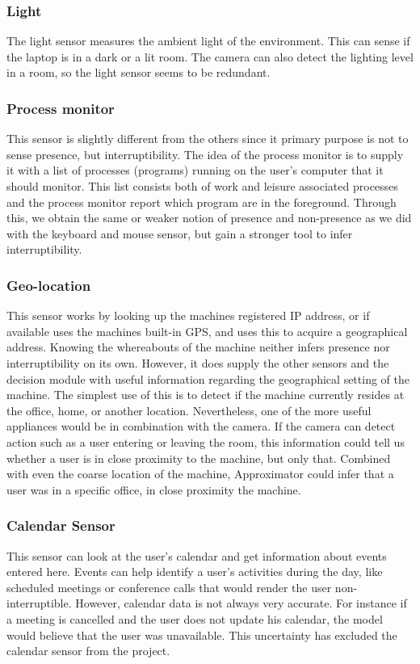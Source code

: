 \documentclass{sigchi}
\begin{document}
\subsubsection{Light}
The light sensor measures the ambient light of the environment.
This can sense if the laptop is in a dark or a lit room.
The camera can also detect the lighting level in a room, so the light sensor seems to be redundant.

\subsubsection{Process monitor}
This sensor is slightly different from the others since it primary purpose is not to sense presence, but interruptibility.
The idea of the process monitor is to supply it with a list of processes (programs) running on the user's computer that it should monitor.
This list consists both of work and leisure associated processes and the process monitor report which program are in the foreground.
Through this, we obtain the same or weaker notion of presence and non-presence as we did with the keyboard and mouse sensor, but gain a stronger tool to infer interruptibility.

\subsubsection{Geo-location}
This sensor works by looking up the machines registered IP address, or if available uses the machines built-in GPS, and uses this to acquire a geographical address.
Knowing the whereabouts of the machine neither infers presence nor interruptibility on its own.
However, it does supply the other sensors and the decision module with useful information regarding the geographical setting of the machine.
The simplest use of this is to detect if the machine currently resides at the office, home, or another location.
Nevertheless, one of the more useful appliances would be in combination with the camera.
If the camera can detect action such as a user entering or leaving the room, this information could tell us whether a user is in close proximity to the machine, but only that.
Combined with even the coarse location of the machine, Approximator could infer that a user was in a specific office, in close proximity the machine.

\subsubsection{Calendar Sensor}
This sensor can look at the user's calendar and get information about events entered here.
Events can help identify a user's activities during the day, like scheduled meetings or conference calls that would render the user non-interruptible.
However, calendar data is not always very accurate.
For instance if a meeting is cancelled and the user does not update his calendar, the model would believe that the user was unavailable.
This uncertainty has excluded the calendar sensor from the project.
\end{document}
